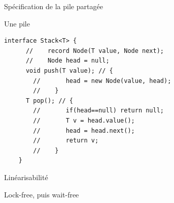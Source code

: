 
\begingroup

\begin{frame}[fragile]{Spécification de la pile partagée}

  \begin{description}
  \item[Spécification séquentielle :] Une pile
  \end{description}

  \begin{lstlisting}[gobble=4]
    interface Stack<T> {
      //    record Node(T value, Node next); 
      //    Node head = null; 
      void push(T value); // {
        //       head = new Node(value, head);
        //    }
      T pop(); // {
        //       if(head==null) return null;
        //       T v = head.value();
        //       head = head.next();
        //       return v;
        //    }
    }
  \end{lstlisting}

  \begin{description}
  \item[Critère de cohérence :] Linéarisabilité
  \item[Condition de progression :] Lock-free, puis wait-free
  \end{description}

\end{frame}

\endgroup
\endinput

